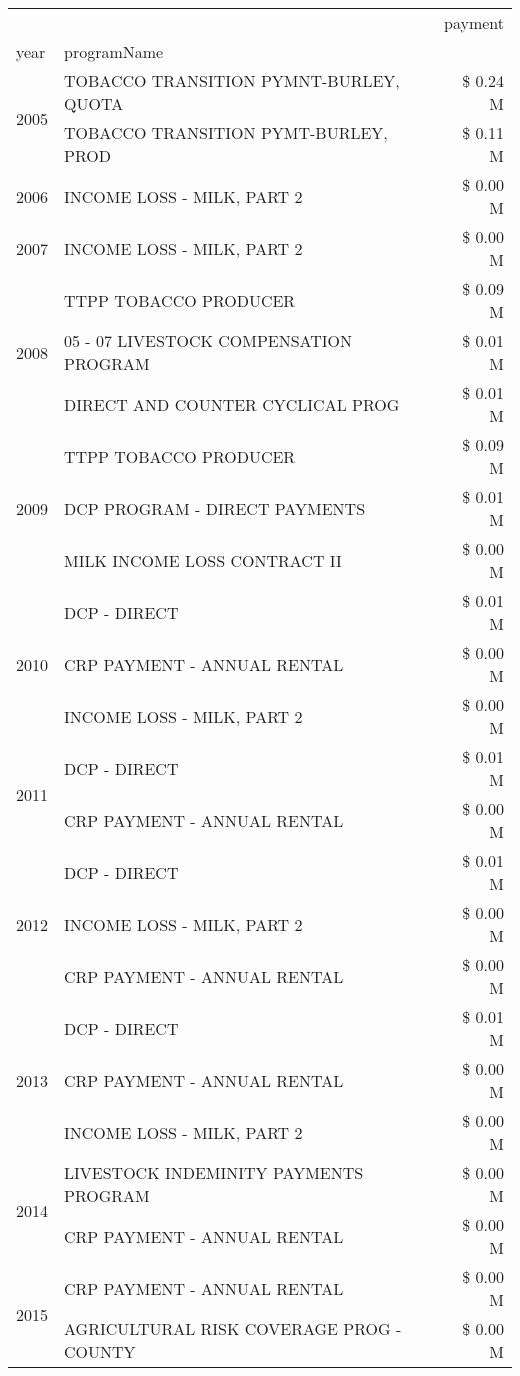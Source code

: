 \begin{tabular}{llr}
\toprule
 &  & payment \\
year & programName &  \\
\midrule
\multirow[t]{2}{*}{2005} & TOBACCO TRANSITION PYMNT-BURLEY, QUOTA & \$ 0.24 M \\
 & TOBACCO TRANSITION PYMT-BURLEY, PROD & \$ 0.11 M \\
\cline{1-3}
2006 & INCOME LOSS - MILK, PART 2 & \$ 0.00 M \\
\cline{1-3}
2007 & INCOME LOSS - MILK, PART 2 & \$ 0.00 M \\
\cline{1-3}
\multirow[t]{3}{*}{2008} & TTPP TOBACCO PRODUCER & \$ 0.09 M \\
 & 05 - 07 LIVESTOCK COMPENSATION PROGRAM & \$ 0.01 M \\
 & DIRECT AND COUNTER CYCLICAL PROG & \$ 0.01 M \\
\cline{1-3}
\multirow[t]{3}{*}{2009} & TTPP TOBACCO PRODUCER & \$ 0.09 M \\
 & DCP PROGRAM - DIRECT PAYMENTS & \$ 0.01 M \\
 & MILK INCOME LOSS CONTRACT II & \$ 0.00 M \\
\cline{1-3}
\multirow[t]{3}{*}{2010} & DCP - DIRECT & \$ 0.01 M \\
 & CRP PAYMENT - ANNUAL RENTAL & \$ 0.00 M \\
 & INCOME LOSS - MILK, PART 2 & \$ 0.00 M \\
\cline{1-3}
\multirow[t]{2}{*}{2011} & DCP - DIRECT & \$ 0.01 M \\
 & CRP PAYMENT - ANNUAL RENTAL & \$ 0.00 M \\
\cline{1-3}
\multirow[t]{3}{*}{2012} & DCP - DIRECT & \$ 0.01 M \\
 & INCOME LOSS - MILK, PART 2 & \$ 0.00 M \\
 & CRP PAYMENT - ANNUAL RENTAL & \$ 0.00 M \\
\cline{1-3}
\multirow[t]{3}{*}{2013} & DCP - DIRECT & \$ 0.01 M \\
 & CRP PAYMENT - ANNUAL RENTAL & \$ 0.00 M \\
 & INCOME LOSS - MILK, PART 2 & \$ 0.00 M \\
\cline{1-3}
\multirow[t]{2}{*}{2014} & LIVESTOCK INDEMINITY PAYMENTS PROGRAM & \$ 0.00 M \\
 & CRP PAYMENT - ANNUAL RENTAL & \$ 0.00 M \\
\cline{1-3}
\multirow[t]{2}{*}{2015} & CRP PAYMENT - ANNUAL RENTAL & \$ 0.00 M \\
 & AGRICULTURAL RISK COVERAGE PROG - COUNTY & \$ 0.00 M \\

\end{tabular}

